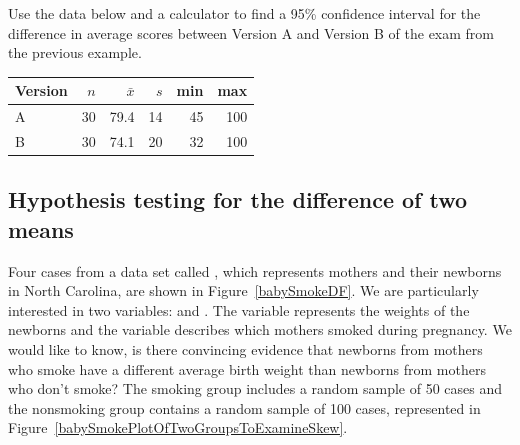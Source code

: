 \begin{exercisewrap}
\begin{nexercise}Use the data below and a calculator to find a 95\% confidence interval for the difference in average scores between Version A and Version B of the exam from the previous example.\footnotemark
\begin{center}
\begin{tabular}{l rrrrr}
\hline
Version\hspace{2mm}	& $n$	& $\bar{x}$	& $s$	& min	& max  \\
\hline
A		& 30		& 79.4		& 14 	& 45		& 100 \\
B		& 30		& 74.1		& 20		& 32		& 100 \\
\hline
\end{tabular}
\end{center}
\end{nexercise}
\end{exercisewrap}



\subsection{Hypothesis testing for the difference of two means}


Four cases from a data set called , which represents mothers and their newborns in North Carolina, are shown in Figure~\ref{babySmokeDF}. We are particularly interested in two variables:  and . The  variable represents the weights of the newborns and the  variable describes which mothers smoked during pregnancy. We would like to know, is there convincing evidence that newborns from mothers who smoke have a different average birth weight than newborns from mothers who don't smoke? The smoking group includes a random sample of 50 cases and the nonsmoking group contains a random sample of 100 cases, represented in Figure~\ref{babySmokePlotOfTwoGroupsToExamineSkew}.

